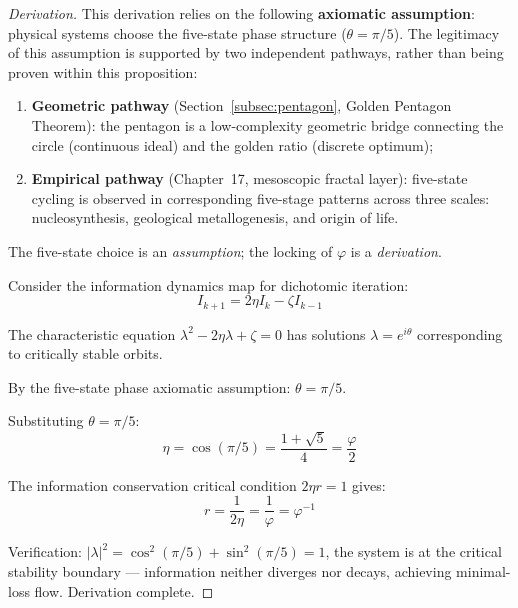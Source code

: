 \documentclass[12pt,a4paper,twocolumn]{article}
\renewcommand{\phi}{\varphi}
\begin{document}
\begin{proof}[Derivation]
This derivation relies on the following \textbf{axiomatic assumption}: physical systems choose the five-state phase structure ($\theta = \pi/5$). The legitimacy of this assumption is supported by two independent pathways, rather than being proven within this proposition:
\begin{enumerate}
\item \textbf{Geometric pathway} (Section~\ref{subsec:pentagon}, Golden Pentagon Theorem): the pentagon is a low-complexity geometric bridge connecting the circle (continuous ideal) and the golden ratio (discrete optimum);
\item \textbf{Empirical pathway} (Chapter~17, mesoscopic fractal layer): five-state cycling is observed in corresponding five-stage patterns across three scales: nucleosynthesis, geological metallogenesis, and origin of life.
\end{enumerate}
The five-state choice is an \emph{assumption}; the locking of $\phi$ is a \emph{derivation}.

Consider the information dynamics map for dichotomic iteration:
\begin{equation}
I_{k+1} = 2\eta I_k - \zeta I_{k-1}
\end{equation}

The characteristic equation $\lambda^2 - 2\eta\lambda + \zeta = 0$ has solutions $\lambda = e^{i\theta}$ corresponding to critically stable orbits.

By the five-state phase axiomatic assumption: $\theta = \pi/5$.

Substituting $\theta = \pi/5$:
\begin{equation}
\eta = \cos(\pi/5) = \frac{1+\sqrt{5}}{4} = \frac{\phi}{2}
\end{equation}

The information conservation critical condition $2\eta r = 1$ gives:
\begin{equation}
r = \frac{1}{2\eta} = \frac{1}{\phi} = \phi^{-1}
\end{equation}

Verification: $|\lambda|^2 = \cos^2(\pi/5) + \sin^2(\pi/5) = 1$, the system is at the critical stability boundary --- information neither diverges nor decays, achieving minimal-loss flow. Derivation complete.
\end{proof}
\end{document}
